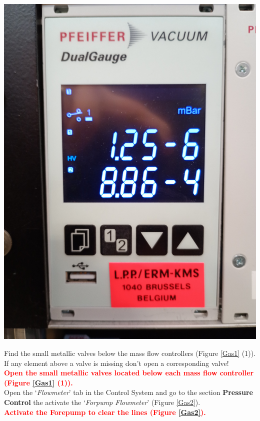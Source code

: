 \documentclass[fleqn,a4paper,20pt]{article}
\begin{document}
\begin{minipage}{.3\textwidth}
	\centering
	\includegraphics[width=\linewidth]{Pressure1}
\end{minipage}


\vspace{0.5cm}
Find the small metallic valves below the mass flow controllers (Figure \ref{Gas1} (1)). If any element above a valve is missing don’t open a corresponding valve! \\

\textcolor{red}{\textbf{Open the small metallic valves located below each mass flow controller (Figure \ref{Gas1} (1)).}}\\

Open the `\textit{Flowmeter}' tab in the Control System and go to the section \textbf{Pressure Control} the activate the `\textit{Forpump Flowmeter}' (Figure \ref{Gas2}).\\


\textcolor{red}{\textbf{Activate the Forepump to clear the lines (Figure \ref{Gas2}).}}\\
\end{document}
